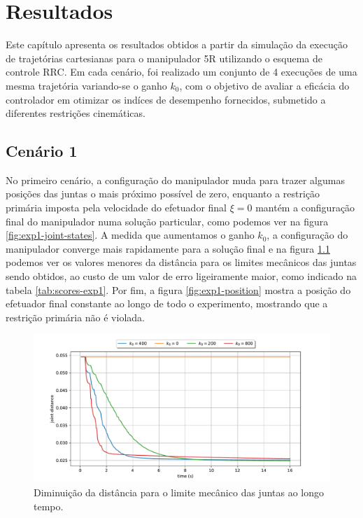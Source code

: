 \chapter{Resultados}\label{cap:results}

Este capítulo apresenta os resultados obtidos a partir da simulação da 
execução de trajetórias cartesianas para o manipulador 5R utilizando o esquema 
de controle RRC. Em cada cenário, foi realizado um conjunto de 4 execuções de 
uma mesma trajetória variando-se o ganho \(k_0\), com o objetivo de avaliar 
a eficácia do controlador em otimizar os indíces de desempenho fornecidos, submetido 
a diferentes restrições cinemáticas.

\section{Cenário 1}

No primeiro cenário, a configuração do manipulador muda para trazer algumas posições 
das juntas o mais próximo possível de zero, enquanto a restrição primária imposta pela velocidade 
do efetuador final \(\xi = 0\) mantém a configuração final do manipulador numa solução particular, 
como podemos ver na figura \ref*{fig:exp1-joint-states}. A medida que aumentamos o ganho \(k_0\), a 
configuração do manipulador converge mais rapidamente para a solução final e na figura \ref*{fig:exp1-metric} 
podemos ver os valores menores da distância para os limites mecânicos das juntas sendo obtidos, ao custo 
de um valor de erro ligeiramente maior, como indicado na tabela \ref*{tab:scores-exp1}. Por fim, a figura 
\ref*{fig:exp1-position} mostra a posição do efetuador final constante ao longo de todo o experimento, 
mostrando que a restrição primária não é violada.

\begin{figure}
	\centering
	\includegraphics[width=\textwidth]{./Images/2024-06-11-09-23-42/metric_joint_distance.pdf}
	\caption{Diminuição da distância para o limite mecânico das juntas ao longo tempo.}\label{fig:exp1-metric}
\end{figure}

